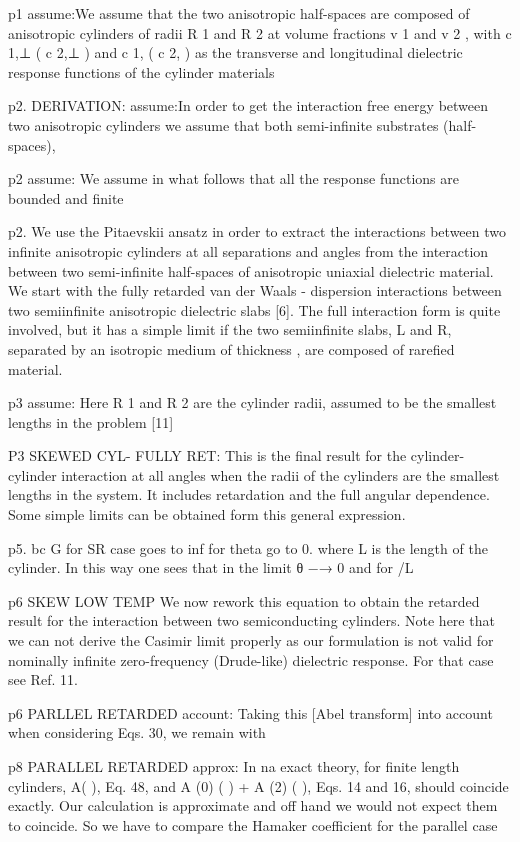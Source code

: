 p1
assume:We assume that the two anisotropic half-spaces are composed of anisotropic cylinders of
radii R 1 and R 2 at volume fractions v 1 and v 2 , with c 1,⊥ ( c 2,⊥ ) and c 1, ( c 2, ) as the transverse and longitudinal
dielectric response functions of the cylinder materials 

p2. DERIVATION: 
assume:In order to get the interaction free energy between two anisotropic cylinders we assume that both semi-infinite
substrates (half-spaces),

p2 assume:
We assume in what follows that all the response functions are bounded and finite

p2. We use the Pitaevskii ansatz in order to extract the interactions between two infinite anisotropic cylinders at
all separations and angles from the interaction between two semi-infinite half-spaces of anisotropic uniaxial dielectric
material. We start with the fully retarded van der Waals - dispersion interactions between two semiinfinite anisotropic
dielectric slabs [6]. The full interaction form is quite involved, but it has a simple limit if the two semiinfinite slabs,
L and R, separated by an isotropic medium of thickness , are composed of rarefied material.

p3 assume:
Here R 1 and R 2 are the cylinder radii, assumed to be the smallest lengths in the problem [11]


P3 SKEWED CYL- FULLY RET:
This is the final result for the cylinder-cylinder interaction at all angles when the radii of the cylinders are the smallest
lengths in the system. It includes retardation and the full angular dependence. Some simple limits can be obtained
form this general expression.

p5. bc G for SR case goes to inf for theta go to 0. where L is the length of the cylinder. In this way one sees that in the limit θ −→ 0 and for /L

p6 SKEW LOW TEMP
We now rework this equation to obtain the retarded result for the interaction between two semiconducting cylinders.
Note here that we can not derive the Casimir limit properly as our formulation is not valid for nominally infinite
zero-frequency
(Drude-like) dielectric response. For that case see Ref. 11.

p6 PARLLEL RETARDED
account: Taking this [Abel transform] into account when considering Eqs. 30, we remain with

p8 PARALLEL RETARDED
approx: In na exact theory, for finite length cylinders, A( ), Eq. 48, and A (0) ( ) + A (2) ( ), Eqs. 14 and 16, should coincide
exactly. Our calculation is approximate and off hand we would not expect them to coincide. So we have to compare
the Hamaker coefficient for the parallel case

